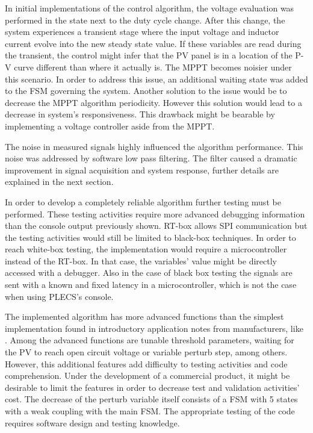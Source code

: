 In initial implementations of the control algorithm, the voltage evaluation was performed in the state next to the duty cycle change. After this change, the system experiences a transient stage where the input voltage and inductor current evolve into the new steady state value. If these variables are read during the transient, the control might infer that the PV panel is in a location of the P-V curve different than where it actually is. The MPPT becomes noisier under this scenario. In order to address this issue, an additional waiting state was added to the FSM governing the system. Another solution to the issue would be to decrease the MPPT algorithm periodicity. However this solution would lead to a decrease in system's responsiveness. This drawback might be bearable by implementing a voltage controller aside from the MPPT.  

The noise in measured signals highly influenced the algorithm performance. This noise was addressed by software low pass filtering. The filter caused a dramatic improvement in signal acquisition and system response, further details are explained in the next section.

In order to develop a completely reliable algorithm further testing must be performed. These testing activities require more advanced debugging information than the console output previously shown. RT-box allows SPI communication but the testing activities would still be limited to black-box techniques. In order to reach white-box testing, the implementation would require a microcontroller instead of the RT-box. In that case, the variables' value might be directly accessed with a debugger. Also in the case of black box testing the signals are sent with a known and fixed latency in a microcontroller, which is not the case when using PLECS's console.

The implemented algorithm has more advanced functions than the simplest implementation found in introductory application notes from manufacturers, like \cite{AN1521_MC}. Among the advanced functions are tunable threshold parameters, waiting for the PV to reach open circuit voltage or variable perturb step, among others. However, this additional features add difficulty to testing activities and code comprehension. Under the development of a commercial product, it might be desirable to limit the features in order to decrease test and validation activities' cost. The decrease of the perturb variable itself consists of a FSM with 5 states with a weak coupling with the main FSM. The appropriate testing of the code requires software design and testing knowledge.

